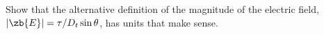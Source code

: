 Show that the alternative definition of the magnitude of the electric field,
        $|\zb{E}|=\tau/D_t\sin\theta$, has units that make sense.
